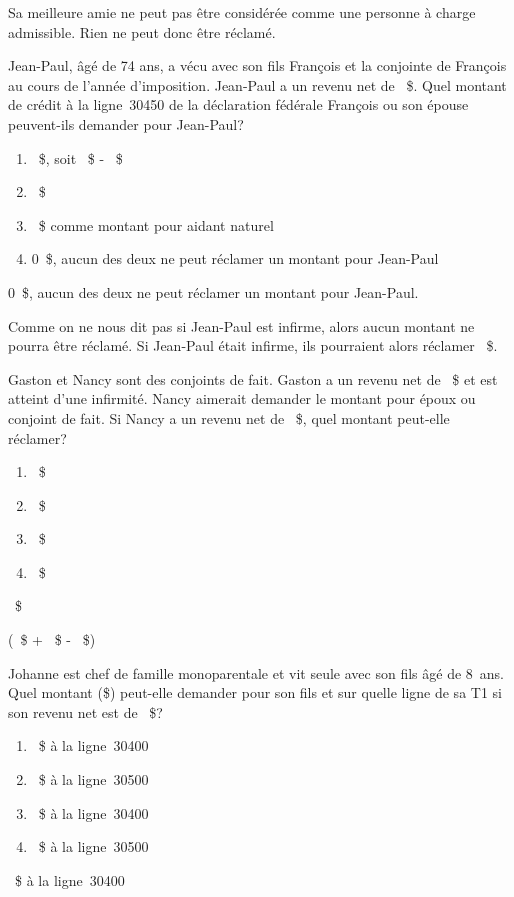 Sa meilleure amie ne peut pas être considérée comme une personne à charge admissible. Rien ne peut donc être réclamé.

\begin{question}
	Jean-Paul, âgé de 74 ans, a vécu avec son fils François et la conjointe de François au cours de l'année d'imposition. Jean-Paul a un revenu net de ~\$. Quel montant de crédit à la ligne~30450 de la déclaration fédérale François ou son épouse peuvent-ils demander pour Jean-Paul?
	\begin{enumerate}[label=\Alph*.]
		\item {}~\$, soit ~\$ - ~\$ 
		\item {}~\$
		\item {}~\$ comme montant pour aidant naturel
		\item 0~\$, aucun des deux ne peut réclamer un montant pour Jean-Paul
	\end{enumerate}
\end{question}
0~\$, aucun des deux ne peut réclamer un montant pour Jean-Paul.

Comme on ne nous dit pas si Jean-Paul est infirme, alors aucun montant ne pourra être réclamé. Si Jean-Paul était infirme, ils pourraient alors réclamer ~\$.

\begin{question}
	Gaston et Nancy sont des conjoints de fait. Gaston a un revenu net de ~\$ et est atteint d'une infirmité. Nancy aimerait demander le montant pour époux ou conjoint de fait. Si Nancy a un revenu net de ~\$, quel montant peut-elle réclamer?
	\begin{enumerate}[label=\Alph*.]
		\item {}~\$
		\item {}~\$
		\item {}~\$
		\item {}~\$
	\end{enumerate}
\end{question}
~\$

(~\$ + ~\$ - ~\$)

\begin{question}
	Johanne est chef de famille monoparentale et vit seule avec son fils âgé de 8~ans. Quel montant (\$) peut-elle demander pour son fils et sur quelle ligne de sa T1 si son revenu net est de ~\$?
	\begin{enumerate}[label=\Alph*.]
		\item {}~\$ à la ligne~30400
		\item {}~\$ à la ligne~30500
		\item {}~\$ à la ligne~30400
		\item {}~\$ à la ligne~30500
	\end{enumerate}
\end{question}
~\$ à la ligne~30400

